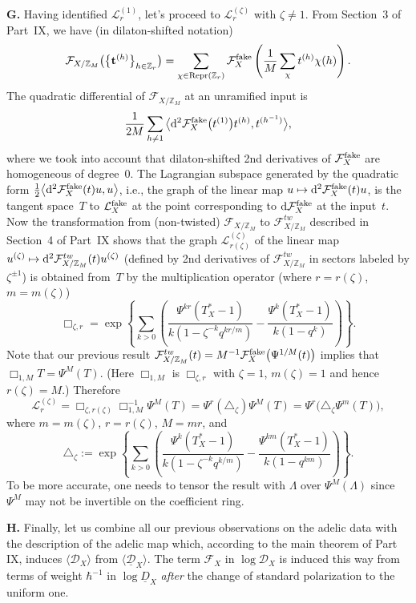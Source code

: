 \documentclass[pdftex]{sigma}
\def\D{\mathcal D}
\def\F{\mathcal F}
\def\L{\mathcal L}
\def\ZZ{\mathbb Z}
\def\t{{\mathbf t}}
\def\h{\hbar}
\def\lan{\langle}
\def\ran{\rangle}
\def\square{\Box}
\def\und{\underline}
\renewcommand{\Delta}{\triangle}
\begin{document}
{\bf G.} Having identified $\L_r^{(1)}$, let's proceed to $\L_r^{(\zeta)}$ with $\zeta\neq 1$. From Section~3 of Part~IX, we have (in dilaton-shifted notation)
 \[ \F_{X/\ZZ_M}\big(\big\{ \t^{(h)} \big\}_{h\in \ZZ_r}\big) = \sum_{\chi \in \operatorname{Repr} (\ZZ_r)}\F_X^{\rm fake}\left(\frac{1}{M} \sum_{\chi} t^{(h)} \chi(h) \right) .\]
 The quadratic differential of $\F_{X/\ZZ_M}$ at an unramified input is
 \[ \frac{1}{2M} \sum_{h\neq 1} \big\lan {\rm d}^2\F_X^{\rm fake}\big(t^{(1)}\big) t^{(h)}, t^{(h^{-1})}\big\ran ,\]
 where we took into account that dilaton-shifted 2nd derivatives of $\F_X^{\rm fake}$ are homogeneous of degree~$0$. The Lagrangian subspace generated by the quadratic form $\frac{1}{2} \big\lan {\rm d}^2\F_X^{\rm fake}(t) u, u\big\ran$, i.e., the graph of the linear map $u\mapsto {\rm d}^2\F_X^{\rm fake}(t) u$, is the tangent space~$T$ to $\L_X^{\rm fake}$ at the point corresponding to ${\rm d}\F_X^{\rm fake}$ at the input~$t$. Now the transformation from (non-twisted) $\F_{X/\ZZ_M}$ to $\F_{X/\ZZ_M}^{tw}$ described in Section~4 of Part~IX shows that the graph $\L_{r(\zeta)}^{(\zeta)}$ of the linear map $u^{(\zeta)} \mapsto {\rm d}^2\F_{X/\ZZ_M}^{tw}(t) u^{(\zeta)}$ (defined by 2nd derivatives of $\F_{X/\ZZ_M}^{tw}$ in sectors labeled by $\zeta^{\pm 1}$) is obtained from~$T$ by the multiplication operator (where $r=r(\zeta)$, $m=m(\zeta)$)
 \[ \square_{\zeta, r} = \exp\left\{\sum_{k>0}\left(\frac{\Psi^{kr}(T^*_X-1)}{k(1-\zeta^{-k}q^{kr/m})}-
 \frac{\Psi^k(T^*_X-1)}{k(1-q^k)}\right)\right\}.\]
Note that our previous result $\F_{X/\ZZ_M}^{tw}(t)=M^{-1}\F_X^{\rm fake}\big(\Psi^{1/M}(t)\big)$
implies that $\square_{1,M} T = \Psi^M(T)$. (Here $\square_{1,M}$ is $\square_{\zeta,r}$ with $\zeta=1$, $m(\zeta)=1$ and hence $r(\zeta)=M$.) Therefore
\[ \L_{r}^{(\zeta)} = \square_{\zeta, r(\zeta)} \square_{1,M}^{-1} \Psi^M(T)= \Psi^r(\Delta_{\zeta}) \Psi^M(T) = \Psi^r \big( \Delta_{\zeta} \Psi^m(T)\big),\]
where $m=m(\zeta)$, $r=r(\zeta)$, $M=mr$, and
 \[ \Delta_{\zeta}:= \exp\left\{ \sum_{k>0}\left(\frac{\Psi^{k}(T^*_X-1)}{k(1-\zeta^{-k}q^{k/m})} -\frac{\Psi^{km}(T^*_X-1)}{k(1-q^{km})}\right)\right\}.
 \]
 To be more accurate, one needs to tensor the result with $\Lambda$ over $\Psi^M(\Lambda)$ since $\Psi^M$ may not be invertible on the coefficient ring.

{\bf H.} Finally, let us combine all our previous observations on the adelic data with the description of the adelic map which, according to the main theorem of Part IX, induces $\lan\D_X\ran$ from $\lan \und{\D}_X\ran$.
 The term $\F_X$ in $\log \D_X$ is induced this way from terms of weight $\h^{-1}$ in $\log \und{D}_X$ {\em after} the change of standard polarization to the uniform one.
\end{document}
